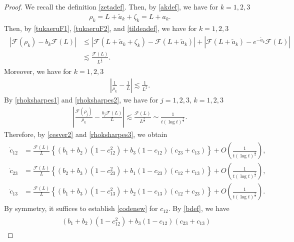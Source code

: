 \documentclass[reqno]{amsart}
\theoremstyle{plain}
\theoremstyle{definition}
\numberwithin{equation}{section}
\newcommand{\1}{\mathbbm{1}}
\begin{document}
\begin{proof}
We recall the definition \eqref{zetadef}. Then, by \eqref{akdef}, we have for $k=1,2,3$
\begin{align*}
\rho_k=L+\tilde{a}_k+\zeta_k=L+a_k.
\end{align*}
Then, by \eqref{tukaeruF1}, \eqref{tukaeruF2}, and \eqref{tildeadef}, we have for $k=1,2,3$
\begin{align}\label{rhoksharpes1}
\begin{aligned}
\left| \mathcal{F}(\rho_k)-b_k\mathcal{F}(L)\right|&\leq\left|\mathcal{F}(L+\tilde{a}_k+\zeta_k)-\mathcal{F}(L+\tilde{a}_k)\right|+\left| \mathcal{F}(L+\tilde{a}_k)-e^{-\tilde{a}_k}\mathcal{F}(L)\right|
\\
&\lesssim \frac{\mathcal{F}(L)}{L^{\frac{1}{2}} }.
\end{aligned}
\end{align}
Moreover, we have for $k=1,2,3$
\begin{align}\label{rhoksharpes2}
\left|\frac{1}{\rho_k}-\frac{1}{L}\right|\lesssim \frac{1}{L^2}.
\end{align}
By \eqref{rhoksharpes1} and \eqref{rhoksharpes2}, we have for $j=1,2,3$, $k=1,2,3$
\begin{align}\label{rhoksharpes3}
\left|\frac{\mathcal{F}(\rho_j)}{\rho_k}-\frac{b_j\mathcal{F}(L)}{L}\right|\lesssim \frac{\mathcal{F}(L)}{L^{\frac{3}{2}}}\sim \frac{1}{t(\log{t})^{\frac{3}{2}}}.
\end{align}
Therefore, by \eqref{cesver2} and \eqref{rhoksharpes3}, we obtain
\begin{align}\label{cjkesrev}
\begin{aligned}
\dot{c}_{12}&=\frac{\mathcal{F}(L)}{L}\left\{ (b_1+b_2)(1-c_{12}^2)+b_3(1-c_{12})(c_{23}+c_{13})\right\}+O\left(\frac{1}{t(\log{t})^{\frac{3}{2}}}\right),
\\
\dot{c}_{23}&=\frac{\mathcal{F}(L)}{L}\left\{ (b_2+b_3)(1-c_{23}^2)+b_1(1-c_{23})(c_{12}+c_{13})\right\}+O\left(\frac{1}{t(\log{t})^{\frac{3}{2}}}\right),
\\
\dot{c}_{13}&=\frac{\mathcal{F}(L)}{L}\left\{ (b_1+b_3)(1-c_{13}^2)+b_2(1-c_{13})(c_{12}+c_{23})\right\}+O\left(\frac{1}{t(\log{t})^{\frac{3}{2}}}\right).
\end{aligned}
\end{align}
By symmetry, it suffices to establish \eqref{codenew} for $c_{12}$. By \eqref{bdef}, we have
\begin{align}\label{turaikeisan0}
\begin{aligned}
&\quad (b_1+b_2)(1-c_{12}^2)+b_3(1-c_{12})(c_{23}+c_{13})

\end{aligned}
\end{align}
\end{proof}
\end{document}
